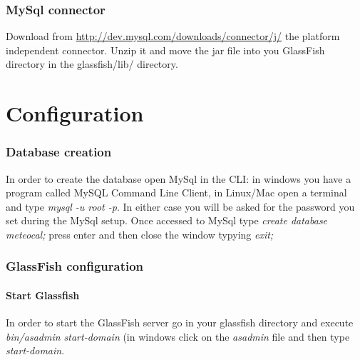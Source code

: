 \documentclass[10pt,a4paper,titlepage]{article}
\begin{document}
\section{MySql connector}
Download from \url{http://dev.mysql.com/downloads/connector/j/} the platform independent connector. Unzip it and move the jar file into you GlassFish directory in the glassfish/lib/ directory.

\part{Configuration}

\section{Database creation}
In order to create the database open MySql in the CLI: in windows you have a program called MySQL Command Line Client, in Linux/Mac open a terminal and type \emph{mysql -u root -p}. In either case you will be asked for the password you set during the MySql setup. Once accessed to MySql type \emph{create database meteocal;} press enter and then close the window typying \emph{exit;}

\section{GlassFish configuration}
\subsection{Start Glassfish}
In order to start the GlassFish server go in your glassfish directory and execute \emph{bin/asadmin start-domain} (in windows click on the \emph{asadmin} file and then type \emph{start-domain}.
\end{document}
